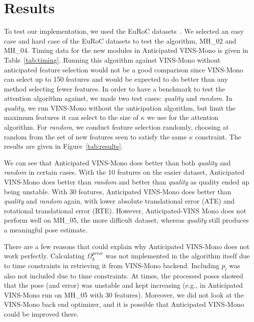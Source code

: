 
\section{Results}\label{sec:results}

To test our implementation, we used the EuRoC datasets~\cite{Burri2016}.
We selected an easy case and hard case of the EuRoC datasets to test the algorithm, MH\_02 and MH\_04.
Timing data for the new modules in Anticipated VINS-Mono is given in Table~\ref{tab:timing}.
Running this algorithm against VINS-Mono without anticipated feature selection would not be a good comparison since VINS-Mono can select up to 150 features and would be expected to do better than any method selecting fewer features.
In order to have a benchmark to test the attention algorithm against, we made two test cases: \textit{quality} and \textit{random}.
In \textit{quality}, we run VINS-Mono without the anticipation algorithm, but limit the maximum features it can select to the size of $\kappa$ we use for the attention algorithm.
For \textit{random}, we conduct feature selection randomly, choosing at random from the set of new features seen to satisfy the same $\kappa$ constraint.
The results are given in Figure~\ref{tab:results}.

We can see that Anticipated VINS-Mono does better than both \textit{quality} and \textit{random} in certain cases.
With the 10 features on the easier dataset, Anticipated VINS-Mono does better than \textit{random} and better than \textit{quality} as quality ended up being unstable.
With 30 features, Anticipated VINS-Mono does better than \textit{quality} and \textit{random} again, with lower absolute translational error (ATE) and rotational translational error (RTE).
However, Anticipated-VINS Mono does not perform well on MH\_05, the more difficult dataset, whereas \textit{quality} still produces a meaningful pose estimate.

There are a few reasons that could explain why Anticipated VINS-Mono does not work perfectly.
Calculating $\Omega_k^{prior}$ was not implemented in the algorithm itself due to time constraints in retrieving it from VINS-Mono backend.
Including $p_l$ was also not included due to time constraints.
At times, the processed poses showed that the pose (and error) was unstable and kept increasing (e.g., in Anticipated VINS-Mono run on MH\_05 with 30 features).
Moreover, we did not look at the VINS-Mono back end optimizer, and it is possible that Anticipated VINS-Mono could be improved there.

